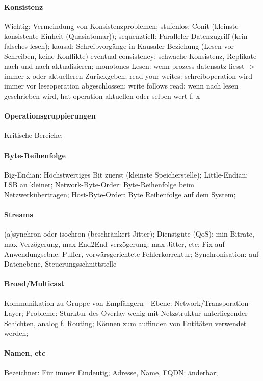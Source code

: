 \documentclass[pagesize,11pt,a4paper]{scrartcl}
\begin{document}
\paragraph*{Konsistenz}
	Wichtig: Vermeindung von Konsistenzproblemen;
	stufenlos: Conit (kleinste konsistente Einheit (Quasiatomar));
	sequenztiell: Paralleler Datenzugriff (kein falsches lesen);
	kausal: Schreibvorgänge in Kausaler Beziehung (Lesen vor Schreiben, keine Konflikte)
	eventual consistency: schwache Konsistenz, Replikate nach und nach aktualisieren;
	monotones Lesen: wenn prozess datensatz liesst -> immer x oder aktuelleren Zurückgeben;
	read your writes: schreiboperation wird immer vor leseoperation abgeschlossen;
	write follows read: wenn nach lesen geschrieben wird, hat operation aktuellen oder selben wert f. x

\paragraph*{Operationsgruppierungen}
	Kritische Bereiche;

\paragraph*{Byte-Reihenfolge}
	Big-Endian: Höchstwertiges Bit zuerst (kleinste Speicherstelle);
	Little-Endian: LSB an kleiner;
	Network-Byte-Order: Byte-Reihenfolge beim Netzwerkübertragen;
	Host-Byte-Order: Byte Reihenfolge auf dem System;

\paragraph*{Streams}
	(a)synchron oder isochron (beschränkert Jitter);
	Dienstgüte (QoS): min Bitrate, max Verzögerung, max End2End verzögerung; max Jitter, etc;
	Fix auf Anwendungsebne: Puffer, vorwärsgerichtete Fehlerkorrektur;
	Synchronisation: auf Datenebene, Steuerungsschnittstelle

\paragraph*{Broad/Multicast}
	Kommunikation zu Gruppe von Empfängern - Ebene: Network/Transporation-Layer;
	Probleme: Sturktur des Overlay wenig mit Netzstruktur unterliegender Schichten, analog f. Routing;
	Können zum auffinden von Entitäten verwendet werden;

\paragraph*{Namen, etc}
	Bezeichner: Für immer Eindeutig;
	Adresse, Name, FQDN: änderbar;
\end{document}
